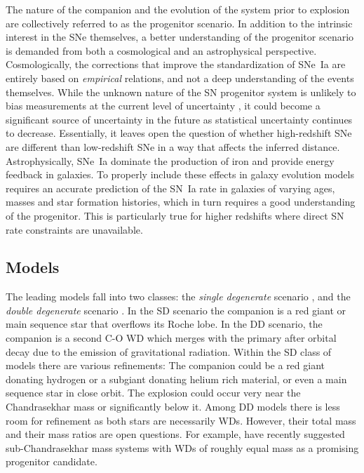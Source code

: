 The nature of the companion and the evolution of the system prior to
explosion are collectively referred to as the progenitor scenario. In
addition to the intrinsic interest in the SNe themselves, a better
understanding of the progenitor scenario is demanded from both a
cosmological and an astrophysical perspective.
Cosmologically, the corrections that improve the standardization of
SNe~Ia are entirely based on \emph{empirical} relations, and not a
deep understanding of the events themselves.  While the unknown nature
of the SN progenitor system is unlikely to bias measurements at the
current level of uncertainty \citep{yungelson00a,sarkar08a}, it could
become a significant source of uncertainty in the future as
statistical uncertainty continues to decrease. Essentially, it leaves
open the question of whether high-redshift SNe are different than
low-redshift SNe in a way that affects the inferred distance.
Astrophysically, SNe~Ia dominate the production of iron
\citep[e.g.,][]{matteucci86a,tsujimoto95a,thielemann96a} and provide
energy feedback \citep{scannapieco06a} in galaxies. To properly
include these effects in galaxy evolution models requires an accurate
prediction of the SN~Ia rate in galaxies of varying ages, masses and
star formation histories, which in turn requires a good understanding
of the progenitor. This is particularly true for higher redshifts
where direct SN rate constraints are unavailable.


\subsection{Models}

The leading models fall into two classes: the {\it single degenerate}
scenario \citep[SD;][]{whelan73a,nomoto82a}, and the {\it double
  degenerate} scenario \citep[DD;][]{iben84a,webbink84a}. In the SD
scenario the companion is a red giant or main sequence star that
overflows its Roche lobe. In the DD scenario, the companion is a
second C-O WD which merges with the primary after orbital decay due to
the emission of gravitational radiation.  Within the SD class of
models there are various refinements: The companion could be a red
giant donating hydrogen or a subgiant donating helium rich material,
or even a main sequence star in close orbit. The explosion could occur
very near the Chandrasekhar mass or significantly below it.
Among DD models there is less room for refinement as both stars are
necessarily WDs. However, their total mass and their mass ratios are
open questions. For example, \citet{vankerkwijk10a} have recently
suggested sub-Chandrasekhar mass systems with WDs of roughly equal
mass as a promising progenitor candidate.

